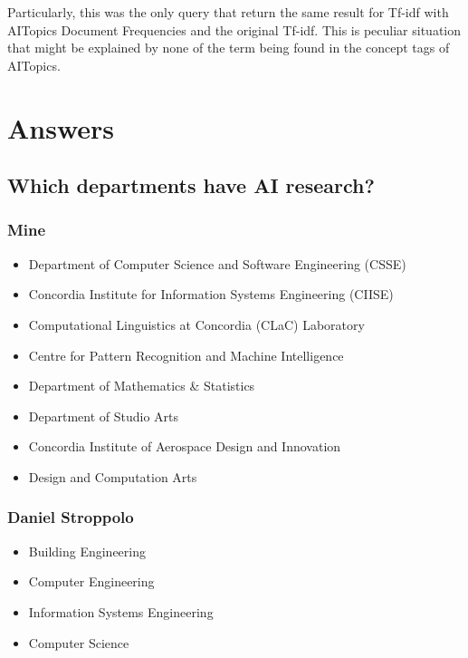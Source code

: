 \par Particularly, this was the only query that return the same result for Tf-idf with AITopics Document Frequencies and the original Tf-idf. This is peculiar situation that might be explained by none of the term being found in the concept tags of AITopics. 

\chapter{Answers}

\section{Which departments have AI research?}

\subsection{Mine}

\begin{itemize}
    \item Department of Computer Science and Software Engineering (CSSE)
    \item Concordia Institute for Information Systems Engineering (CIISE)
    \item Computational Linguistics at Concordia (CLaC) Laboratory
    \item Centre for Pattern Recognition and Machine Intelligence
    \item Department of Mathematics \& Statistics
    \item Department of Studio Arts
    \item Concordia Institute of Aerospace Design and Innovation
    \item Design and Computation Arts
\end{itemize}

\subsection{Daniel Stroppolo}

\begin{itemize}
    \item Building Engineering
    \item Computer Engineering
    \item Information Systems Engineering
    \item Computer Science
\end{itemize}

